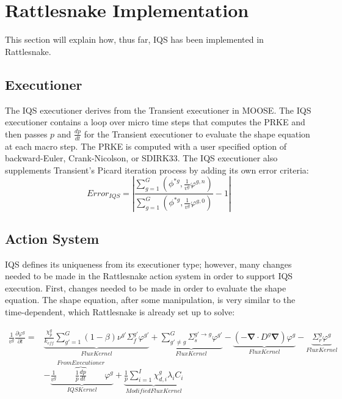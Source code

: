 \documentclass[10pt]{scrartcl}
\renewcommand{\div}{\bs{\nabla}\! \cdot \!}
\newcommand{\grad}{\bs{\nabla}}
\newcommand{\bs}[1]{\mathbf{#1}}
\newcommand{\keff}{k_\textit{eff}}
\newcommand{\be}{\begin{equation}}
\newcommand{\ee}{\end{equation}}
\begin{document}
\section{Rattlesnake Implementation}

This section will explain how, thus far, IQS has been implemented in Rattlesnake. 
 
\subsection{Executioner}
The IQS executioner derives from the Transient executioner in MOOSE.  The IQS executioner contains a loop over micro time steps that computes the PRKE and then passes $p$ and $\frac{dp}{dt}$ for the Transient executioner to evaluate the shape equation at each macro step.  The PRKE is computed with a user specified option of backward-Euler, Crank-Nicolson, or SDIRK33.   The IQS executioner also supplements Transient’s Picard iteration process by adding its own error criteria:
\be
Error_{IQS}=\left|\frac{\sum_{g=1}^G\left(\phi^{*g},\frac{1}{v^g}\varphi^{g,n}\right)}{\sum_{g=1}^G\left(\phi^{*g},\frac{1}{v^g}\varphi^{g,0}\right)}-1\right|
\ee

\subsection{Action System}
IQS defines its uniqueness from its executioner type; however, many changes needed to be made in the Rattlesnake action system in order to support IQS execution.   First, changes needed to be made in order to evaluate the shape equation.  The shape equation, after some manipulation, is very similar to the time-dependent, which Rattlesnake is already set up to solve:

\begin{align}
\frac{1}{v^g}\frac{\partial\varphi^g}{\partial t}=&\underbrace{\frac{\chi_p^g}{\keff} \sum_{g'=1}^G (1-\beta) \nu^{g'} \Sigma_f^{g'} \varphi^{g'}}_{Flux Kernel} + \underbrace{\sum_{g'\neq g}^G\Sigma_s^{g'\to g} \varphi^{g'}}_{Flux Kernel} - \underbrace{\left( -\div D^g \grad \right)\varphi^g}_{Flux Kernel} - \underbrace{\Sigma_r^g\varphi^g}_{Flux Kernel} \nonumber \\
& - \underbrace{\frac{1}{v^g} \overbrace{\frac{1}{p}\frac{dp}{dt}}^{From Executioner}\varphi^g}_{IQS Kernel}+\underbrace{\frac{1}{p}\sum_{i=1}^I\chi_{d,i}^g\lambda_iC_i}_{Modified Flux Kernel}
\end{align}
\end{document}
